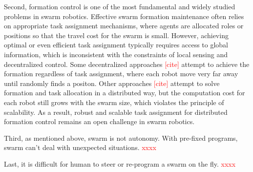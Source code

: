 Second, formation control is one of the most fundamental and widely studied problems in swarm robotics.
Effective swarm formation maintenance often relies on appropriate task assignment mechanisms, where agents are allocated roles or positions so that the travel cost for the swarm is small.
However, achieving optimal or even efficient task assignment typically requires access to global information, which is inconsistent with the constraints of local sensing and decentralized control.
Some decentralized approaches \textcolor{red}{[cite]} attempt to achieve the formation regardless of task assignment, where each robot move very far away until randomly finds a positon.
Other approaches \textcolor{red}{[cite]} attempt to solve formation and task allocation in a distributed way, but the computation cost for each robot still grows with the swarm size, which violates the principle of scalability.
As a result, robust and scalable task assignment for distributed formation control remains an open challenge in swarm robotics.

Third, as mentioned above, swarm is not autonomy.
With pre-fixed programs, swarm can't deal with unexpected situations.
\textcolor{red}{xxxx}

Last, it is difficult for human to steer or re-program a swarm on the fly.
\textcolor{red}{xxxx}


